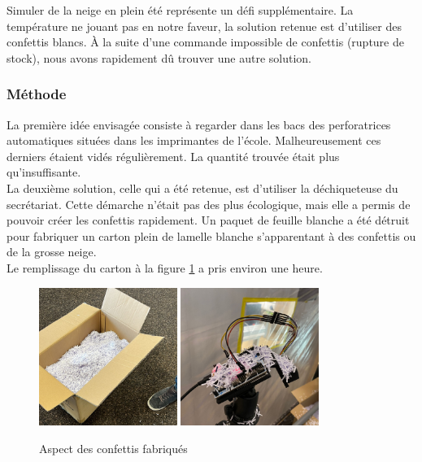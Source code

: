 Simuler de la neige en plein été représente un défi supplémentaire. La température ne jouant pas en notre 
faveur, la solution retenue est d’utiliser des confettis blancs. À la suite d’une commande impossible 
de confettis (rupture de stock), nous avons rapidement dû trouver une autre solution.

\subsubsection{Méthode}

La première idée envisagée consiste à regarder dans les bacs des perforatrices automatiques situées 
dans les imprimantes de l’école. Malheureusement ces derniers étaient vidés régulièrement. La quantité 
trouvée était plus qu’insuffisante.\\
La deuxième solution, celle qui a été retenue, est d’utiliser la déchiqueteuse du secrétariat. Cette 
démarche n’était pas des plus écologique, mais elle a permis de pouvoir créer les confettis rapidement. 
Un paquet de feuille blanche a été détruit pour fabriquer un carton plein de lamelle blanche s’apparentant 
à des confettis ou de la grosse neige. \\
Le remplissage du carton à la figure \ref{fig:confettis} a pris environ une heure. 

\begin{figure}[H]
    \centering
    \includegraphics[width=0.4\textwidth]{Images/photos_PGA/ConfBox.jpeg}
    \includegraphics[width=0.4\textwidth]{Images/photos_PGA/conf.jpeg}
    \caption{Aspect des confettis fabriqués}
    \label{fig:confettis}
\end{figure}

